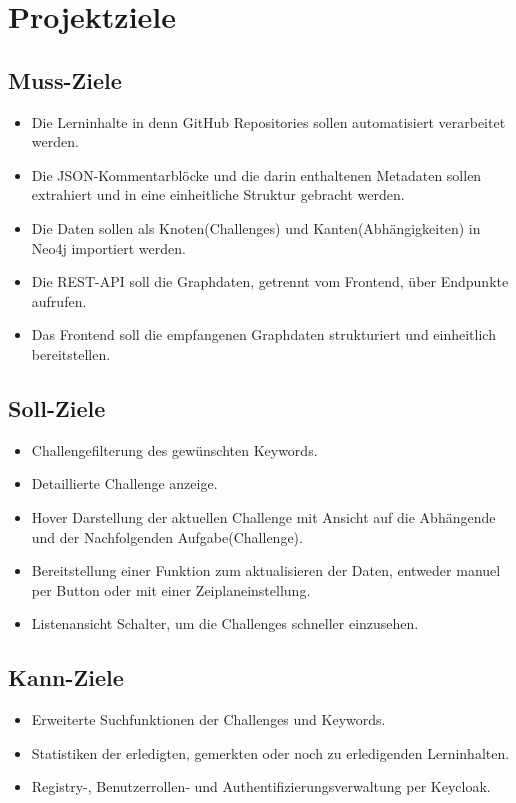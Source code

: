\section{Projektziele}

\subsection{Muss-Ziele}

\begin{itemize}[itemsep=0.4pt]
    \item Die Lerninhalte in denn GitHub Repositories sollen automatisiert verarbeitet werden.
    \item Die JSON-Kommentarblöcke und die darin enthaltenen Metadaten sollen extrahiert und in eine einheitliche Struktur gebracht werden.
    \item Die Daten sollen als Knoten(Challenges) und Kanten(Abhängigkeiten) in Neo4j importiert werden.
    \item Die REST-API soll die Graphdaten, getrennt vom Frontend, über Endpunkte aufrufen.
    \item Das Frontend soll die empfangenen Graphdaten strukturiert und einheitlich bereitstellen.
\end{itemize}

\subsection{Soll-Ziele}

\begin{itemize}[itemsep=0.4pt]
    \item Challengefilterung des gewünschten Keywords.
    \item Detaillierte Challenge anzeige.
    \item Hover Darstellung der aktuellen Challenge mit Ansicht auf die Abhängende und der Nachfolgenden Aufgabe(Challenge).
    \item Bereitstellung einer Funktion zum aktualisieren der Daten, entweder manuel per Button oder mit einer Zeiplaneinstellung.
    \item Listenansicht Schalter, um die Challenges schneller einzusehen.
\end{itemize}

\subsection{Kann-Ziele}

\begin{itemize}[itemsep=0.4pt]
    \item Erweiterte Suchfunktionen der Challenges und Keywords.
    \item Statistiken der erledigten, gemerkten oder noch zu erledigenden Lerninhalten.
    \item Registry-, Benutzerrollen- und Authentifizierungsverwaltung per Keycloak.
\end{itemize}

